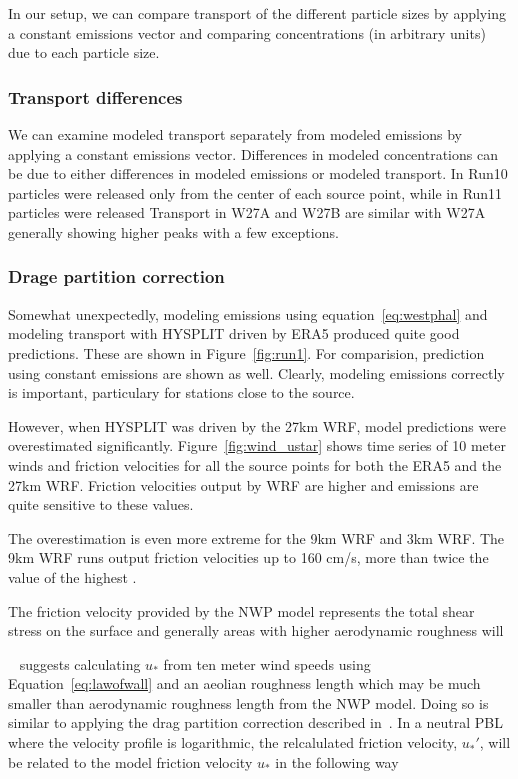 \documentclass[draft]{agujournal2018}
\begin{document}
In our setup, we can compare transport of the different particle sizes by applying a constant emissions vector and comparing concentrations (in arbitrary units) due to each
particle size. 

\subsubsection{Transport differences}
We can examine modeled transport separately from modeled emissions by applying a constant emissions vector. 
Differences in modeled concentrations can be due to either differences in modeled emissions or modeled transport. 
In Run10 particles were released only from the center of each source point, while in Run11 particles were released 
Transport in W27A and W27B are similar with W27A generally showing higher peaks with a few exceptions. 


\subsubsection{Drage partition correction}

Somewhat unexpectedly, modeling emissions using equation~\ref{eq:westphal} and modeling transport with HYSPLIT driven by ERA5 produced quite good predictions. These are shown in Figure~\ref{fig:run1}.
For comparision, prediction using constant emissions are shown as well. Clearly, modeling emissions correctly is important, particulary for stations close to the source.


However, when HYSPLIT was driven by the 27km WRF, model predictions were overestimated significantly. 
Figure~\ref{fig:wind_ustar} shows time series of 10 meter winds and friction velocities for all the source points for both the ERA5
and the 27km WRF. Friction velocities output by WRF are higher and emissions are quite sensitive to these values. 

The overestimation is even more extreme for the 9km WRF  and 3km WRF.
The 9km WRF runs output friction velocities up to 160 cm/s, more than twice the value of the highest .

The friction velocity provided by the NWP model represents the total shear stress on the surface and generally areas with higher aerodynamic roughness will 



~\cite{Darmenova} suggests calculating $u_*$ from ten meter wind speeds using Equation~\ref{eq:lawofwall} and an aeolian roughness length which may be much smaller than aerodynamic roughness length from the NWP model.  Doing so is similar to applying the 
drag partition correction described in~\citep{Marticorena97,MacKinnon04,Darmenova09}. 
In a neutral PBL where the velocity profile is logarithmic, the relcalulated friction velocity, $u_*'$, will be related to the model friction velocity $u_*$ in the following way
\end{document}
